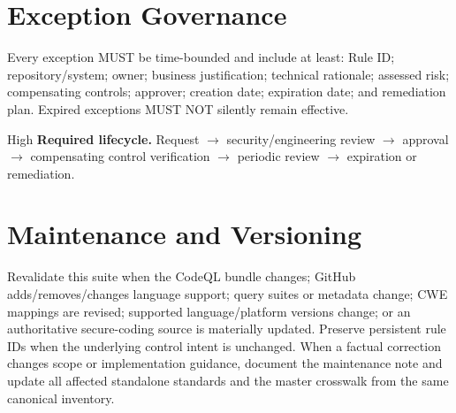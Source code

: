 \documentclass[10pt,letterpaper]{article}
\begin{document}
\section{Exception Governance}
Every exception MUST be time-bounded and include at least: Rule ID; repository/system; owner; business justification; technical rationale; assessed risk; compensating controls; approver; creation date; expiration date; and remediation plan. Expired exceptions MUST NOT silently remain effective.

\begin{callout}{High}
\textbf{Required lifecycle.} Request $\rightarrow$ security/engineering review $\rightarrow$ approval $\rightarrow$ compensating control verification $\rightarrow$ periodic review $\rightarrow$ expiration or remediation.
\end{callout}

\section{Maintenance and Versioning}
Revalidate this suite when the CodeQL bundle changes; GitHub adds/removes/changes language support; query suites or metadata change; CWE mappings are revised; supported language/platform versions change; or an authoritative secure-coding source is materially updated. Preserve persistent rule IDs when the underlying control intent is unchanged. When a factual correction changes scope or implementation guidance, document the maintenance note and update all affected standalone standards and the master crosswalk from the same canonical inventory.
\end{document}
